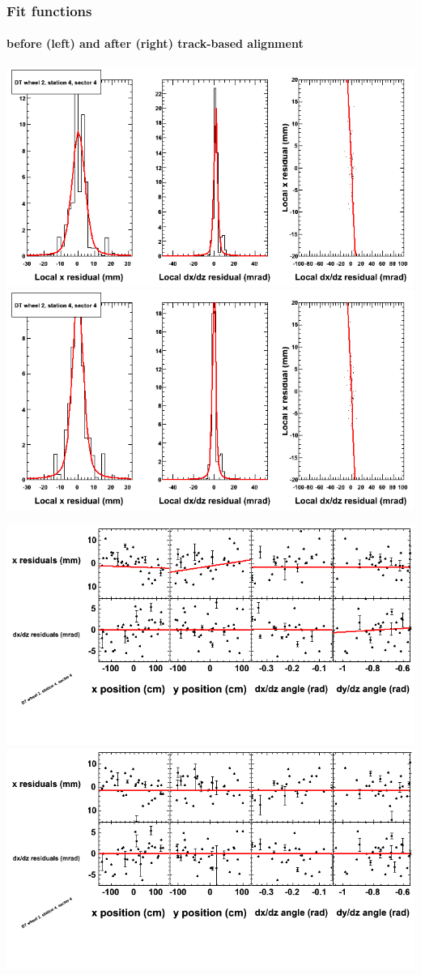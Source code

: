 \documentclass[compress]{beamer}
\begin{document}
\begin{frame}
\frametitle{Fit functions}
\framesubtitle{before (left) and after (right) track-based alignment}
\includegraphics[width=0.5\linewidth]{fitfunctions_re01/MBwhEst4sec04_bellcurves.png} \includegraphics[width=0.5\linewidth]{fitfunctions_re05/MBwhEst4sec04_bellcurves.png}

\includegraphics[width=0.5\linewidth]{fitfunctions_re01/MBwhEst4sec04_polynomials.png} \includegraphics[width=0.5\linewidth]{fitfunctions_re05/MBwhEst4sec04_polynomials.png}
\end{frame}
\end{document}
